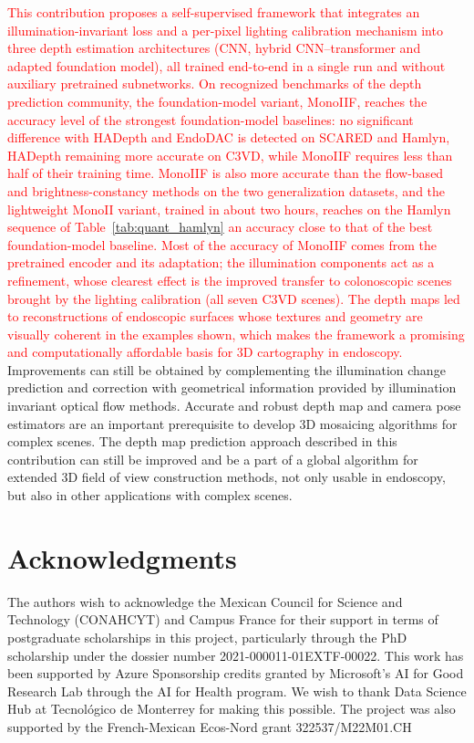 \documentclass[a4paper,fleqn]{cas-dc}
\begin{document}
\textcolor{red}{This contribution proposes a self-supervised framework that integrates an illumination-invariant loss and a per-pixel lighting calibration mechanism into three depth estimation architectures (CNN, hybrid CNN--transformer and adapted foundation model), all trained end-to-end in a single run and without auxiliary pretrained subnetworks. On recognized benchmarks of the depth prediction community, the foundation-model variant, MonoIIF, reaches the accuracy level of the strongest foundation-model baselines: no significant difference with HADepth and EndoDAC is detected on SCARED and Hamlyn, HADepth remaining more accurate on C3VD, while MonoIIF requires less than half of their training time. MonoIIF is also more accurate than the flow-based and brightness-constancy methods on the two generalization datasets, and the lightweight MonoII variant, trained in about two hours, reaches on the Hamlyn sequence of Table~\ref{tab:quant_hamlyn} an accuracy close to that of the best foundation-model baseline. Most of the accuracy of MonoIIF comes from the pretrained encoder and its adaptation; the illumination components act as a refinement, whose clearest effect is the improved transfer to colonoscopic scenes brought by the lighting calibration (all seven C3VD scenes). The depth maps led to reconstructions of endoscopic surfaces whose textures and geometry are visually coherent in the examples shown, which makes the framework a promising and computationally affordable basis for 3D cartography in endoscopy.} Improvements can still be obtained by complementing the illumination change prediction and correction with geometrical information provided by illumination invariant optical flow methods. Accurate and robust depth map and camera pose estimators are an important prerequisite to develop 3D mosaicing algorithms for complex scenes. The depth map prediction approach described in this contribution can still be improved and be a part of a global algorithm for extended 3D field of view construction methods, not only usable in endoscopy, but also in other applications with complex scenes.  


\section*{Acknowledgments}

The authors wish to acknowledge the Mexican Council for Science and Technology (CONAHCYT) and Campus France for their support in terms of postgraduate scholarships in this project, particularly through the PhD scholarship under the dossier number 2021-000011-01EXTF-00022. This work has been supported by Azure Sponsorship credits granted by Microsoft’s AI for Good Research Lab through the AI for Health program. We wish to thank Data Science Hub at Tecnológico de Monterrey for making this possible. The project was also supported by the French-Mexican Ecos-Nord grant  322537/M22M01.CH
\end{document}
